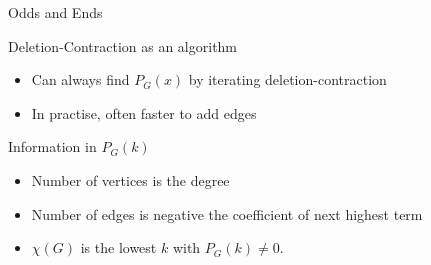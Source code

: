 \documentclass{beamer}
\begin{document}
\begin{frame}{Odds and Ends}
  \begin{block}{Deletion-Contraction as an algorithm}
    \begin{itemize}
    \item Can always find $P_G(x)$ by iterating deletion-contraction
    \item In practise, often faster to add edges
      \end{itemize}
  \end{block}

  \begin{block}{Information in $P_G(k)$}
    \begin{itemize}
    \item Number of vertices is the degree
    \item Number of edges is negative the coefficient of next highest term
      \item $\chi(G)$ is the lowest $k$ with $P_G(k)\neq 0$.
\end{itemize}

    \end{block}

    



\end{frame}
\end{document}
